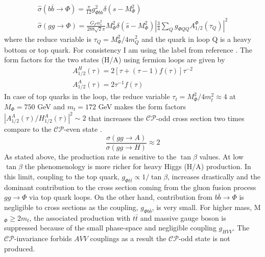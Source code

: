 \begin{equation}
\begin{split}
\hat{\sigma}\left(b\bar{b}\rightarrow\Phi\right) = \frac{\pi}{12}g^{2}_{\Phi bb}\delta\left(\hat{s}-M^{2}_{\Phi}\right)\\
\hat{\sigma}\left(gg\rightarrow\Phi\right) = \frac{G_{F}\alpha^{2}_{s}}{288\sqrt{2}\pi}M^{2}_{\Phi}\delta\left(\hat{s}-M^{2}_{\Phi}\right)\left|\frac{3}{4} \sum\limits_{Q}g_{\Phi QQ}A_{1/2}^{\Phi}\left(\tau_{Q}\right)\right|^{2}
\end{split}
\end{equation}
where the reduce variable is $\tau_{Q} = M_{\Phi}^{2}/4m_{Q}^{2}$ and the quark in loop Q is a heavy bottom or top quark. For consistency I am using the label from reference \cite{Djouadi:2015jea}. The form factors for the two states (H/A) using fermion loops are given by
\begin{equation}\label{equ:form_factors}
\begin{split}
A^{H}_{1/2}\left(\tau\right) = 2\left[\tau+\left(\tau-1\right)f\left(\tau\right)\right]\tau^{-2}\\
A^{A}_{1/2}\left(\tau\right) = 2\tau^{-1}f\left(\tau\right)
\end{split}
\end{equation} 
In case of top quarks in the loop, the reduce variable $\tau_{t} = M_{\Phi}^{2}/4m_{t}^{2} \approx 4$ at $M_{\Phi}=750$ GeV and $m_{t}=172$ GeV makes the form factors $\left|A^{A}_{1/2}\left(\tau\right)/H^{A}_{1/2}\left(\tau\right)\right|^{2} \sim 2$ that increases the $\mathcal{CP}$-odd cross section two times compare to the $\mathcal{CP}$-even state \cite{Djouadi:2016eyy}.
\begin{equation}
\frac{\sigma\left(gg\rightarrow A\right)}{\sigma\left(gg\rightarrow H\right)}\approx 2
\end{equation}
As stated above, the production rate is sensitive to the $\tan\beta$ values. At low $\tan\beta$ the phenomenology is more richer for heavy Higgs (H/A) production. In this limit, coupling to the top quark, $g_{\Phi t\bar{t}} \propto 1/\tan\beta$, increases drastically and the dominant contribution to the cross section coming from the gluon fusion process $gg\rightarrow \Phi$ via top quark loops. On the other hand, contribution from $b\bar{b}\rightarrow \Phi$ is negligible to cross sections as the coupling, $g_{\Phi b\bar{b}}$, is very small. For higher mass, M$_{\Phi} \geq 2m_{t}$, the associated production with $t\bar{t}$ and massive gauge boson is suppressed because of the small phase-space and negligible coupling $g_{HVV}$. The $\mathcal{CP}$-invariance forbids $AVV$ couplings as a result the $\mathcal{CP}$-odd state is not produced. \\
